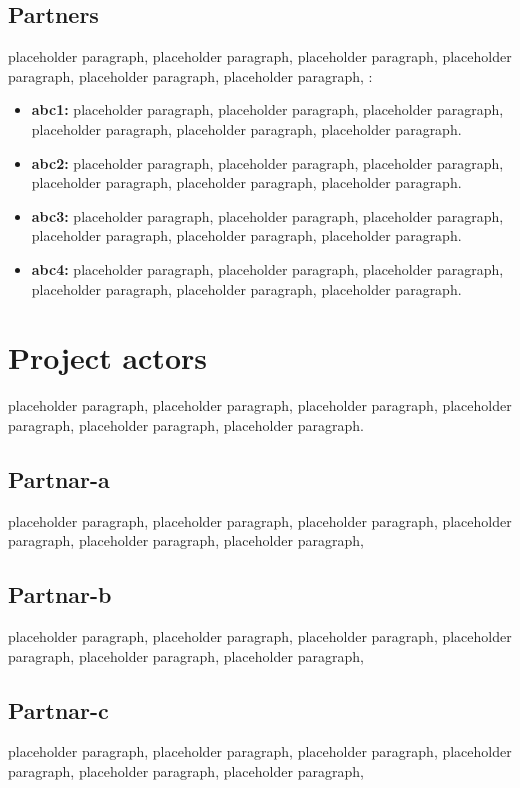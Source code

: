 \subsection{Partners}
\qquad 

placeholder paragraph, placeholder paragraph, placeholder paragraph, placeholder paragraph, placeholder paragraph, placeholder paragraph,
:

\begin{itemize}[label=\textbullet]
    \item \textbf{abc1:} placeholder paragraph, placeholder paragraph, placeholder paragraph, placeholder paragraph, placeholder paragraph, placeholder paragraph.
    \item \textbf{abc2: } placeholder paragraph, placeholder paragraph, placeholder paragraph, placeholder paragraph, placeholder paragraph, placeholder paragraph.
    \item \textbf{abc3:} placeholder paragraph, placeholder paragraph, placeholder paragraph, placeholder paragraph, placeholder paragraph, placeholder paragraph.
    \item \textbf{abc4:} placeholder paragraph, placeholder paragraph, placeholder paragraph, placeholder paragraph, placeholder paragraph, placeholder paragraph.
\end{itemize}


\section{Project actors}
\qquad placeholder paragraph, placeholder paragraph, placeholder paragraph, placeholder paragraph, placeholder paragraph, placeholder paragraph.

\subsection{Partnar-a}
\qquad placeholder paragraph, placeholder paragraph, placeholder paragraph, placeholder paragraph, placeholder paragraph, placeholder paragraph,

\subsection{Partnar-b}
\qquad placeholder paragraph, placeholder paragraph, placeholder paragraph, placeholder paragraph, placeholder paragraph, placeholder paragraph,

\subsection{Partnar-c}
\qquad placeholder paragraph, placeholder paragraph, placeholder paragraph, placeholder paragraph, placeholder paragraph, placeholder paragraph,


